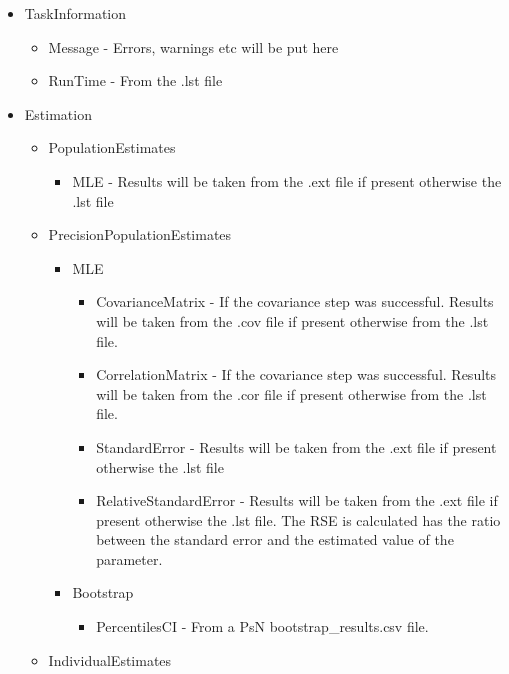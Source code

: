 \begin{itemize}
    \item TaskInformation
        \begin{itemize}
            \item Message - Errors, warnings etc will be put here
            \item RunTime - From the .lst file
        \end{itemize}
    \item Estimation
        \begin{itemize}
            \item PopulationEstimates
            \begin{itemize}
                \item MLE - Results will be taken from the .ext file if present otherwise the .lst file
            \end{itemize}
            \item PrecisionPopulationEstimates
            \begin{itemize}
                \item MLE
                \begin{itemize}
                    \item CovarianceMatrix - If the covariance step was successful. Results will be taken from the .cov file if present otherwise from the .lst file.
                    \item CorrelationMatrix - If the covariance step was successful. Results will be taken from the .cor file if present otherwise from the .lst file.
                    \item StandardError - Results will be taken from the .ext file if present otherwise the .lst file
                    \item RelativeStandardError - Results will be taken from the .ext file if present otherwise the .lst file. The RSE is calculated has the ratio between the standard error and the estimated value of the parameter.
                \end{itemize}
                \item Bootstrap
                \begin{itemize}
                    \item PercentilesCI - From a PsN bootstrap\_results.csv file.
                \end{itemize}
            \end{itemize}
            \item IndividualEstimates

\end{itemize}
\end{itemize}
